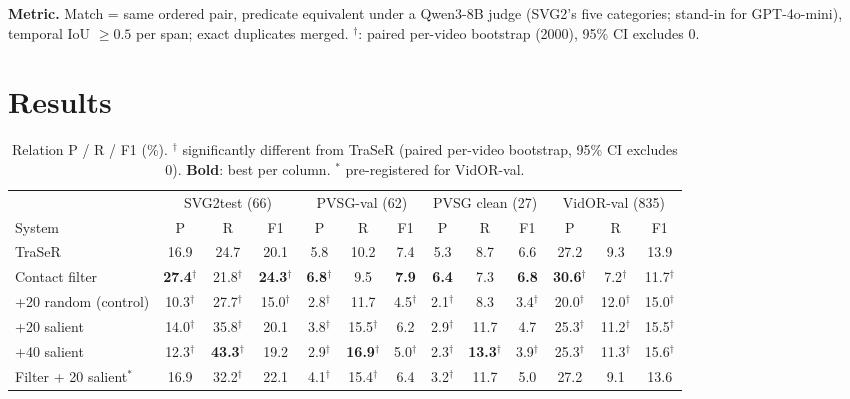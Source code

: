 \documentclass[11pt,a4paper]{article}
\newcommand{\sig}{$^{\dagger}$}
\begin{document}
\textbf{Metric.} Match = same ordered pair, predicate equivalent under a Qwen3-8B judge (SVG2's five categories; stand-in for
GPT-4o-mini), temporal IoU $\geq 0.5$ per span; exact duplicates merged. \sig: paired per-video bootstrap (2000), 95\% CI excludes 0.

\section{Results}
\begin{table}[H]
\centering
\caption{Relation P / R / F1 (\%). $^\dagger$ significantly different from TraSeR (paired per-video bootstrap, 95\% CI excludes 0).
\textbf{Bold}: best per column. $^\ast$ pre-registered for VidOR-val.}
\label{tab:main}
\footnotesize\setlength{\tabcolsep}{2.6pt}
\begin{tabular}{l ccc ccc ccc ccc}
\toprule
 & \multicolumn{3}{c}{SVG2test (66)} & \multicolumn{3}{c}{PVSG-val (62)} & \multicolumn{3}{c}{PVSG clean (27)} & \multicolumn{3}{c}{VidOR-val (835)} \\
\cmidrule(lr){2-4}\cmidrule(lr){5-7}\cmidrule(lr){8-10}\cmidrule(lr){11-13}
System & P & R & F1 & P & R & F1 & P & R & F1 & P & R & F1 \\
\midrule
TraSeR & 16.9 & 24.7 & 20.1 & 5.8 & 10.2 & 7.4 & 5.3 & 8.7 & 6.6 & 27.2 & 9.3 & 13.9 \\
\midrule
Contact filter & \textbf{27.4}$^\dagger$ & 21.8$^\dagger$ & \textbf{24.3}$^\dagger$ & \textbf{6.8}$^\dagger$ & 9.5 & \textbf{7.9} & \textbf{6.4} & 7.3 & \textbf{6.8} & \textbf{30.6}$^\dagger$ & 7.2$^\dagger$ & 11.7$^\dagger$ \\
+20 random (control) & 10.3$^\dagger$ & 27.7$^\dagger$ & 15.0$^\dagger$ & 2.8$^\dagger$ & 11.7 & 4.5$^\dagger$ & 2.1$^\dagger$ & 8.3 & 3.4$^\dagger$ & 20.0$^\dagger$ & 12.0$^\dagger$ & 15.0$^\dagger$ \\
\midrule
+20 salient & 14.0$^\dagger$ & 35.8$^\dagger$ & 20.1 & 3.8$^\dagger$ & 15.5$^\dagger$ & 6.2 & 2.9$^\dagger$ & 11.7 & 4.7 & 25.3$^\dagger$ & 11.2$^\dagger$ & 15.5$^\dagger$ \\
+40 salient & 12.3$^\dagger$ & \textbf{43.3}$^\dagger$ & 19.2 & 2.9$^\dagger$ & \textbf{16.9}$^\dagger$ & 5.0$^\dagger$ & 2.3$^\dagger$ & \textbf{13.3}$^\dagger$ & 3.9$^\dagger$ & 25.3$^\dagger$ & 11.3$^\dagger$ & 15.6$^\dagger$ \\
Filter + 20 salient$^{\ast}$ & 16.9 & 32.2$^\dagger$ & 22.1 & 4.1$^\dagger$ & 15.4$^\dagger$ & 6.4 & 3.2$^\dagger$ & 11.7 & 5.0 & 27.2 & 9.1 & 13.6 \\

\end{tabular}
\end{table}
\end{document}
